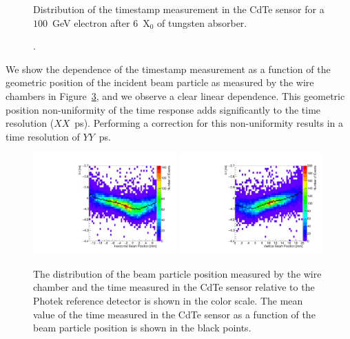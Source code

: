 \documentclass[preprint,1p]{elsarticle}
\begin{document}
\begin{figure}[htbp] 
\centering
\caption{Distribution of the timestamp measurement in the CdTe sensor for a $100$~GeV
electron after $6$~$\mathrm{X}_{0}$ of tungsten absorber. } 
\label{fig:DeltaT} 
\end{figure} 


\begin{figure}[htbp] 
\centering
\caption{. } 
\label{fig:DeltaTVsAmplitude} 
\end{figure} 


We show the dependence of the timestamp measurement as a function of the geometric
position of the incident beam particle as measured by the wire chambers in 
Figure~\ref{fig:DeltaTVsBeamXY}, and we observe a clear linear dependence.
This geometric position non-uniformity of the time response adds significantly to the 
time resolution ($XX$~ps). Performing a correction for this non-uniformity results
in a time resolution of $YY$~ps. 

\begin{figure}[htbp] 
\centering
\includegraphics[width=0.49\textwidth]{figures/DeltaTVsHorizontalPosition.pdf} 
\includegraphics[width=0.49\textwidth]{figures/DeltaTVsVerticalPosition.pdf} 
\caption{ The distribution of the beam particle position measured by the wire chamber
and the time measured in the CdTe sensor relative to the Photek reference detector
is shown in the color scale. The mean value of the time measured in the CdTe sensor as a function
of the beam particle position is shown in the black points.} 
\label{fig:DeltaTVsBeamXY} 
\end{figure} 
\end{document}
